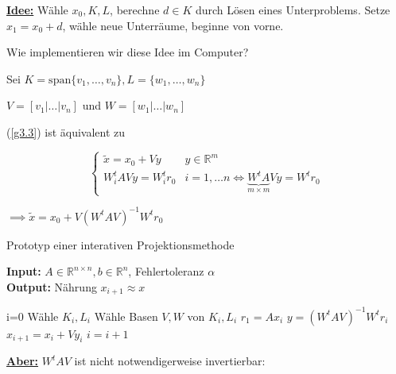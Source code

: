 \documentclass{book}
\def\R{\mathbb{R}}
\begin{document}
            \underline{\textbf{Idee:}} Wähle $x_0,K,L$, berechne $d\in K$ durch Lösen eines Unterproblems. Setze 
            $x_1=x_0+d$, wähle neue Unterräume, beginne von vorne.

            Wie implementieren wir diese Idee im Computer?

            Sei $K=\text{span}\{v_1, \dots, v_n\},L=\{w_1,\dots,w_n\}$

            $V=[v_1\vert \dots\vert v_n]$ und $W=[w_1\vert \dots\vert w_n]$

            (\ref{g3.3}) ist äquivalent zu 

            \begin{equation}\label{g3.4}
                \begin{cases}
                    \tilde{x} = x_0+Vy &  y\in\R^m\\
                    W_i^t A Vy = W_i^t r_0 & i=1,\dots n \iff \underbrace{W^tA}_{m\times m}Vy = W^tr_0
                \end{cases}
            \end{equation}

            $\implies \tilde{x}=x_0+V(W^tAV)^{-1}W^t r_0$ %

            \begin{algorithm}[H]
                \caption{Prototyp einer interativen Projektionsmethode}\label{a3.2}
                \textbf{Input:} $A\in\R^{n\times n},b\in\R^n$, Fehlertoleranz $\alpha$\\
                \textbf{Output:} Nährung $x_{i+1}\approx x$
                \begin{algorithmic}
                \State i=0
                    \State Wähle $K_i,L_i$
                    \State Wähle Basen $V,W$ von $K_i,L_i$
                    \State $r_1=Ax_i$
                    \State $y=(W^tAV)^{-1}W^tr_i$
                    \State $x_{i+1}=x_i+Vy_i$
                    \State $i=i+1$
                \EndWhile
                \end{algorithmic}
            \end{algorithm}

            \underline{\textbf{Aber:}} $W^tAV$ ist nicht notwendigerweise invertierbar:
\end{document}
